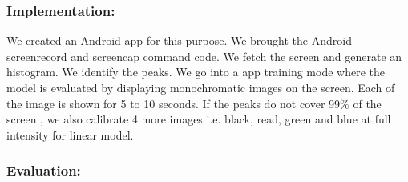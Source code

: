 \subsubsection{Implementation:}
We created an Android app for this purpose.
We brought the Android screenrecord and screencap command code. We fetch
the screen and generate an histogram.
We identify the peaks. We go into a app training mode where the model is evaluated
by displaying monochromatic images on the screen. Each of the image is shown for 5 to 10
seconds.
If the peaks do not cover 99\% of the screen , we also calibrate 4 more images i.e.
black, read, green and blue at full intensity for linear model.

\subsubsection{Evaluation:}
\fi

